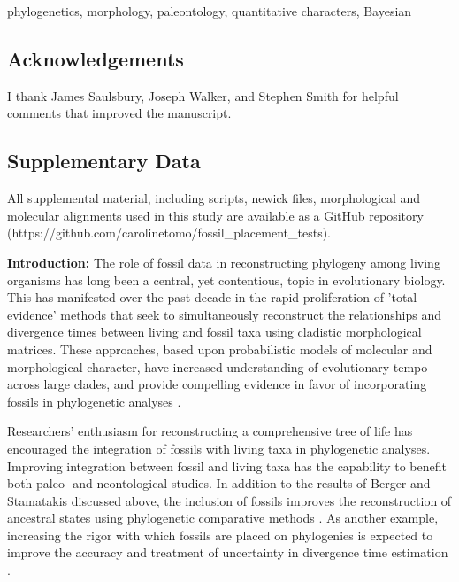 \documentclass[12pt]{article}
\begin{document}
 phylogenetics, morphology, paleontology, quantitative characters, Bayesian

\subsection*{Acknowledgements}
I  thank James Saulsbury, Joseph Walker, and Stephen Smith for helpful comments that improved the manuscript. 

\subsection*{Supplementary Data}
All supplemental material, including scripts, newick files, morphological and molecular alignments used in this study are available as a GitHub repository (https://github.com/carolinetomo/fossil\_placement\_tests). 	

\newpage

\noindent\textbf{Introduction:} The role of fossil data in reconstructing
phylogeny among living organisms has long been a central, yet
contentious, topic in evolutionary biology. This has manifested over the past decade
in the rapid proliferation of 'total-evidence' methods that seek to simultaneously reconstruct the relationships
and divergence times between living and fossil taxa using cladistic morphological matrices.
 These approaches, based upon probabilistic models of molecular and
morphological character, have increased understanding of evolutionary tempo across large clades,
and provide compelling evidence in favor of incorporating fossils in
phylogenetic analyses \citep{pyron2011divergence,ronquist2012total}.

Researchers' enthusiasm for reconstructing a comprehensive tree of life
has encouraged the integration of fossils with living taxa in
phylogenetic analyses. Improving integration between fossil and living
taxa has the capability to benefit both paleo- and neontological
studies. In addition to the results of Berger and Stamatakis discussed
above, the inclusion of fossils improves the reconstruction of ancestral
states using phylogenetic comparative methods \citep{slater2012integrating}. As
another example, increasing the rigor with which fossils are placed on
phylogenies is expected to improve the accuracy and treatment of
uncertainty in divergence time estimation \citep{guindon2018accounting}.
\end{document}
